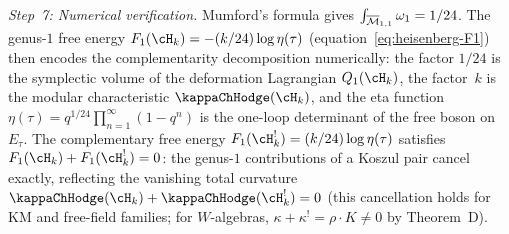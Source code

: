 \begin{computation}
\medskip
\noindent
\textit{Step~7: Numerical verification.}\enspace
Mumford's formula gives
$\int_{\overline{\mathcal{M}}_{1,1}} \omega_1 = 1/24$.
The genus-$1$ free energy
$F_1(\cH_k) = -(k/24)\log\eta(\tau)$
(equation~\eqref{eq:heisenberg-F1}) then encodes the
complementarity decomposition numerically: the
factor $1/24$ is the symplectic volume of the deformation
Lagrangian $Q_1(\cH_k)$, the factor~$k$ is the modular
characteristic $\kappaChHodge(\cH_k)$, and the eta function
$\eta(\tau) = q^{1/24}\prod_{n=1}^\infty(1-q^n)$ is the
one-loop determinant of the free boson on $E_\tau$. The
complementary free energy $F_1(\cH_k^!) = (k/24)\log\eta(\tau)$
satisfies $F_1(\cH_k) + F_1(\cH_k^!) = 0$: the genus-$1$
contributions of a Koszul pair cancel exactly,
reflecting the vanishing total curvature
$\kappaChHodge(\cH_k) + \kappaChHodge(\cH_k^!) = 0$
(this cancellation holds for KM and free-field families;
for $W$-algebras, $\kappa + \kappa^! = \rho \cdot K \neq 0$
by Theorem~D).
\end{computation}

